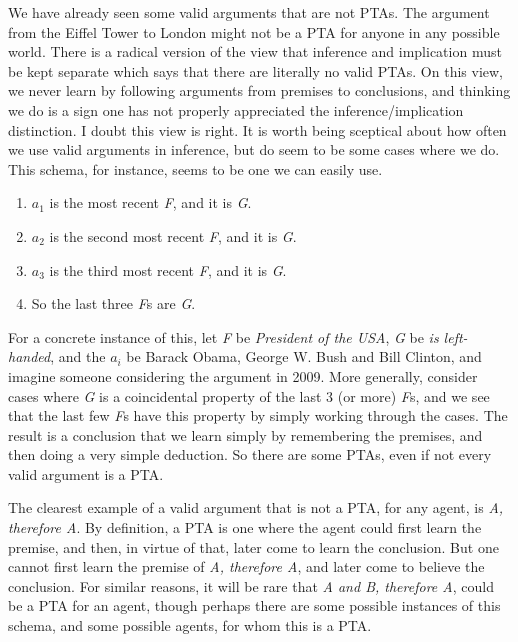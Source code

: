 We have already seen some valid arguments that are not PTAs. The argument from the Eiffel Tower to London might not be a PTA for anyone in any possible world. There is a radical version of the view that inference and implication must be kept separate which says that there are literally no valid PTAs. On this view, we never learn by following arguments from premises to conclusions, and thinking we do is a sign one has not properly appreciated the inference\slash implication distinction. I doubt this view is right. It is worth being sceptical about how often we use valid arguments in inference, but do seem to be some cases where we do. This schema, for instance, seems to be one we can easily use.

\begin{enumerate}
\item{} $a_1$ is the most recent \emph{F}, and it is \emph{G}.

\item{} $a_2$ is the second most recent \emph{F}, and it is \emph{G}.

\item{} $a_3$ is the third most recent \emph{F}, and it is \emph{G}.

\item{} So the last three \emph{F}s are \emph{G}.

\end{enumerate}
For a concrete instance of this, let \emph{F} be \emph{President of the USA}, \emph{G} be \emph{is left-handed}, and the $a_i$ be Barack Obama, George W. Bush and Bill Clinton, and imagine someone considering the argument in 2009. More generally, consider cases where \emph{G} is a coincidental property of the last 3 (or more) \emph{F}s, and we see that the last few \emph{F}s have this property by simply working through the cases. The result is a conclusion that we learn simply by remembering the premises, and then doing a very simple deduction. So there are some PTAs, even if not every valid argument is a PTA.

The clearest example of a valid argument that is not a PTA, for any agent, is \emph{A, therefore A}. By definition, a PTA is one where the agent could first learn the premise, and then, in virtue of that, later come to learn the conclusion. But one cannot first learn the premise of \emph{A, therefore A}, and later come to believe the conclusion. For similar reasons, it will be rare that \emph{A and B, therefore A}, could be a PTA for an agent, though perhaps there are some possible instances of this schema, and some possible agents, for whom this is a PTA.

